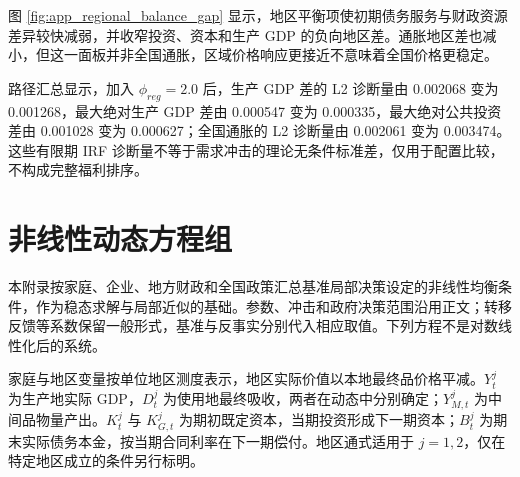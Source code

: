 \documentclass[12pt,UTF8]{ctexart}
\begin{document}
	图 \ref{fig:app_regional_balance_gap} 显示，地区平衡项使初期债务服务与财政资源差异较快减弱，并收窄投资、资本和生产 GDP 的负向地区差。通胀地区差也减小，但这一面板并非全国通胀，区域价格响应更接近不意味着全国价格更稳定。
	
	路径汇总显示，加入 $\phi_{reg}=2.0$ 后，生产 GDP 差的 L2 诊断量由 0.002068 变为 0.001268，最大绝对生产 GDP 差由 0.000547 变为 0.000335，最大绝对公共投资差由 0.001028 变为 0.000627；全国通胀的 L2 诊断量由 0.002061 变为 0.003474。这些有限期 IRF 诊断量不等于需求冲击的理论无条件标准差，仅用于配置比较，不构成完整福利排序。
	
	\section{非线性动态方程组}
	
	本附录按家庭、企业、地方财政和全国政策汇总基准局部决策设定的非线性均衡条件，作为稳态求解与局部近似的基础。参数、冲击和政府决策范围沿用正文；转移反馈等系数保留一般形式，基准与反事实分别代入相应取值。下列方程不是对数线性化后的系统。
	
	家庭与地区变量按单位地区测度表示，地区实际价值以本地最终品价格平减。$Y_t^j$ 为生产地实际 GDP，$D_t^j$ 为使用地最终吸收，两者在动态中分别确定；$Y_{M,t}^j$ 为中间品物量产出。$K_t^j$ 与 $K_{G,t}^j$ 为期初既定资本，当期投资形成下一期资本；$B_t^j$ 为期末实际债务本金，按当期合同利率在下一期偿付。地区通式适用于 $j=1,2$，仅在特定地区成立的条件另行标明。
	
\end{document}
